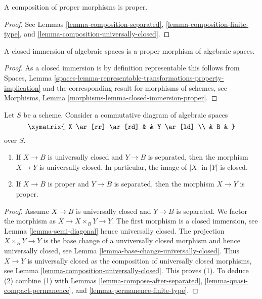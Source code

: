 \begin{lemma}
\label{lemma-composition-proper}
A composition of proper morphisms is proper.
\end{lemma}

\begin{proof}
See
Lemmas \ref{lemma-composition-separated},
\ref{lemma-composition-finite-type}, and
\ref{lemma-composition-universally-closed}.
\end{proof}

\begin{lemma}
\label{lemma-closed-immersion-proper}
A closed immersion of algebraic spaces is a proper morphism of
algebraic spaces.
\end{lemma}

\begin{proof}
As a closed immersion is by definition representable this follows from
Spaces,
Lemma \ref{spaces-lemma-representable-transformations-property-implication}
and the corresponding result for morphisms of schemes, see
Morphisms, Lemma \ref{morphisms-lemma-closed-immersion-proper}.
\end{proof}

\begin{lemma}
\label{lemma-universally-closed-permanence}
Let $S$ be a scheme.
Consider a commutative diagram of algebraic spaces
$$
\xymatrix{
X \ar[rr] \ar[rd] & &
Y \ar[ld] \\
& B &
}
$$
over $S$.
\begin{enumerate}
\item If $X \to B$ is universally closed and $Y \to B$ is
separated, then the morphism $X \to Y$ is universally closed.
In particular, the image of $|X|$ in $|Y|$ is closed.
\item If $X \to B$ is proper and $Y \to B$ is separated, then
the morphism $X \to Y$ is proper.
\end{enumerate}
\end{lemma}

\begin{proof}
Assume $X \to B$ is universally closed and $Y \to B$ is separated.
We factor the morphism as $X \to X \times_B Y \to Y$.
The first morphism is a closed immersion, see
Lemma \ref{lemma-semi-diagonal}
hence universally closed.
The projection $X \times_B Y \to Y$ is the base change
of a unviversally closed morphism and hence
universally closed, see
Lemma \ref{lemma-base-change-universally-closed}.
Thus $X \to Y$ is universally closed as the composition
of universally closed morphisms, see
Lemma \ref{lemma-composition-universally-closed}.
This proves (1). To deduce (2) combine (1) with
Lemmas \ref{lemma-compose-after-separated},
\ref{lemma-quasi-compact-permanence}, and
\ref{lemma-permanence-finite-type}.
\end{proof}

